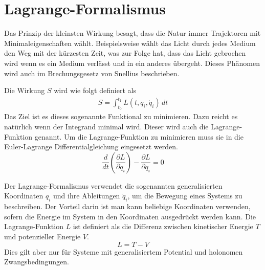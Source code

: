 \section{Lagrange-Formalismus}
Das Prinzip der kleinsten Wirkung besagt, dass die Natur immer Trajektoren mit Minimaleigenschaften wählt.
Beispielsweise wählt das Licht durch jedes Medium den Weg mit der kürzesten Zeit, was zur Folge hat,
dass das Licht gebrochen wird wenn es ein Medium verlässt und in ein anderes übergeht.
Dieses Phänomen wird auch im Brechungsgesetz von Snellius beschrieben.%

Die Wirkung \(S\) wird wie folgt definiert als
\begin{align}
    S = \int_{t_0}^{t_1} L(t,q_i,\dot{q}_i) \,dt 
\end{align}
Das Ziel ist es dieses sogenannte Funktional zu minimieren.
Dazu reicht es natürlich wenn der Integrand minimal wird.
Dieser wird auch die Lagrange-Funktion genannt.
Um die Lagrange-Funktion zu minimieren muss sie in die Euler-Lagrange Differentialgleichung eingesetzt werden.%
\begin{equation}
    \frac{d}{dt} \left( \frac{\partial L}{\partial \dot{q}_i} \right) 
    - \frac{\partial L}{\partial q_i} = 0
\end{equation}

Der Lagrange-Formalismus verwendet die sogenannten generalisierten 
Koordinaten \(q_i\) und ihre Ableitungen \(\dot{q}_i\), um die Bewegung eines Systems zu beschreiben.
Der Vorteil darin ist man kann beliebige Koordinaten verwenden, sofern die Energie im System in 
den Koordinaten ausgedrückt werden kann.
Die Lagrange-Funktion \(L\) ist definiert als die Differenz zwischen
kinetischer Energie \(T\) und potenzieller Energie \(V\).
\begin{equation}
    L = T - V
    \label{eq:lagrange} 
\end{equation}
Dies gilt aber nur für Systeme mit generalisiertem Potential und holonomen Zwangsbedingungen.%


